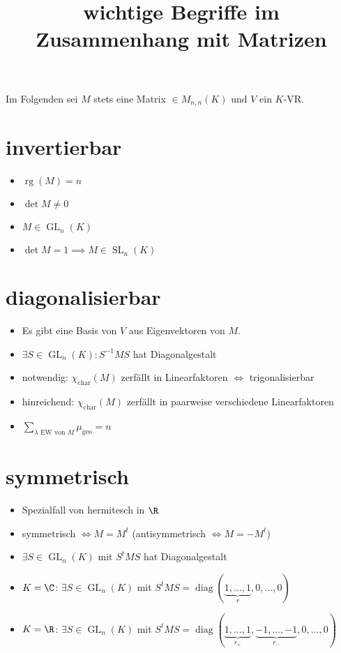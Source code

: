 \documentclass{article}
\title{wichtige Begriffe im Zusammenhang mit Matrizen}
\begin{document}
Im Folgenden sei $M$ stets eine Matrix $\in M_{n, n}(K)$ und $V$ ein $K$-VR.
\section{invertierbar}
\begin{itemize}
    \item $\operatorname{rg}(M) = n$
    \item $\det M \neq 0$
    \item $M\in \operatorname{GL}_n(K)$
    \item $\det M = 1 \implies M \in \operatorname{SL}_n(K)$
\end{itemize}
\section{diagonalisierbar}
\begin{itemize}
    \item Es gibt eine Basis von $V$ aus Eigenvektoren von $M$.
    \item $\exists S \in \operatorname{GL}_n(K): S^{-1} M S$ hat Diagonalgestalt
    \item notwendig: $\chi_\text{char} (M)$ zerfällt in Linearfaktoren $\Leftrightarrow$ trigonalisierbar
    \item hinreichend: $\chi_\text{char} (M)$ zerfällt in paarweise verschiedene Linearfaktoren
    \item $\displaystyle \sum_{\lambda\text{ EW von } M}\mu_\text{geo} = n$
\end{itemize}
\section{symmetrisch}
\begin{itemize}
    \item Spezialfall von hermitesch in $\R$
    \item symmetrisch $\Leftrightarrow M = M^t$ (antisymmetrisch $\Leftrightarrow M = -M^t$)
    \item $\exists S \in \operatorname{GL}_n(K)$ mit $S^t M S$ hat Diagonalgestalt
    \item $K = \C$: $\exists S \in \operatorname{GL}_n(K)$ mit $S^t M S = \operatorname{diag}(\underbrace{1,\dots,1}_{r},0,\dots, 0)$
    \item $K = \R$: $\exists S \in \operatorname{GL}_n(K)$ mit $S^t M S = \operatorname{diag}(\underbrace{1,\dots,1}_{r_+},\underbrace{-1,\dots, -1}_{r_-},0,\dots, 0)$
\end{itemize}
\end{document}
